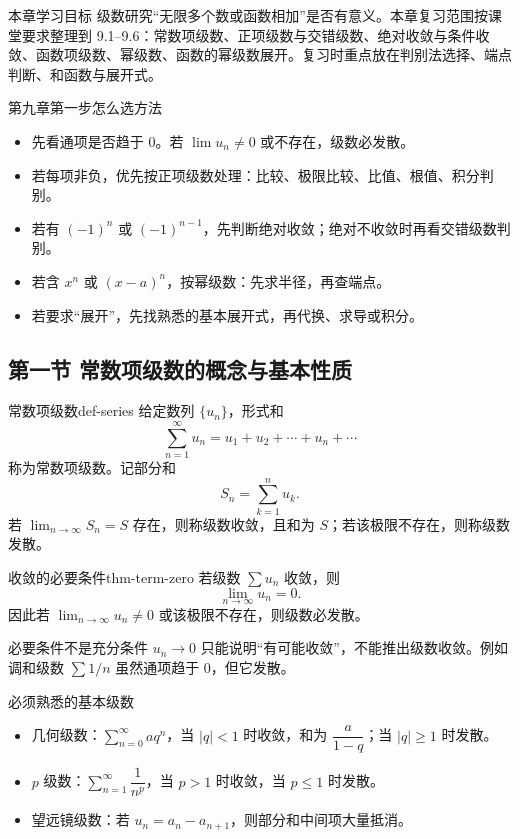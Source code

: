 
\begin{summarybox}{本章学习目标}
级数研究“无限多个数或函数相加”是否有意义。本章复习范围按课堂要求整理到 9.1--9.6：常数项级数、正项级数与交错级数、绝对收敛与条件收敛、函数项级数、幂级数、函数的幂级数展开。复习时重点放在判别法选择、端点判断、和函数与展开式。
\end{summarybox}

\begin{methodbox}{第九章第一步怎么选方法}
\begin{itemize}
  \item 先看通项是否趋于 $0$。若 $\lim u_n\ne0$ 或不存在，级数必发散。
  \item 若每项非负，优先按正项级数处理：比较、极限比较、比值、根值、积分判别。
  \item 若有 $(-1)^n$ 或 $(-1)^{n-1}$，先判断绝对收敛；绝对不收敛时再看交错级数判别。
  \item 若含 $x^n$ 或 $(x-a)^n$，按幂级数：先求半径，再查端点。
  \item 若要求“展开”，先找熟悉的基本展开式，再代换、求导或积分。
\end{itemize}
\end{methodbox}

\subsection{第一节 常数项级数的概念与基本性质}

\begin{dy}{常数项级数}{def-series}
给定数列 $\{u_n\}$，形式和
\[
  \sum_{n=1}^{\infty}u_n=u_1+u_2+\cdots+u_n+\cdots
\]
称为常数项级数。记部分和
\[
  S_n=\sum_{k=1}^{n}u_k.
\]
若 $\lim_{n\to\infty}S_n=S$ 存在，则称级数收敛，且和为 $S$；若该极限不存在，则称级数发散。
\end{dy}

\begin{dl}{收敛的必要条件}{thm-term-zero}
若级数 $\sum u_n$ 收敛，则
\[
  \lim_{n\to\infty}u_n=0.
\]
因此若 $\lim_{n\to\infty}u_n\ne0$ 或该极限不存在，则级数必发散。
\end{dl}

\begin{warningbox}{必要条件不是充分条件}
$u_n\to0$ 只能说明“有可能收敛”，不能推出级数收敛。例如调和级数 $\sum 1/n$ 虽然通项趋于 $0$，但它发散。
\end{warningbox}

\begin{methodbox}{必须熟悉的基本级数}
\begin{itemize}
  \item 几何级数：$\sum_{n=0}^{\infty}aq^n$，当 $|q|<1$ 时收敛，和为 $\dfrac{a}{1-q}$；当 $|q|\ge1$ 时发散。
  \item $p$ 级数：$\sum_{n=1}^{\infty}\dfrac1{n^p}$，当 $p>1$ 时收敛，当 $p\le1$ 时发散。
  \item 望远镜级数：若 $u_n=a_n-a_{n+1}$，则部分和中间项大量抵消。
\end{itemize}
\end{methodbox}

